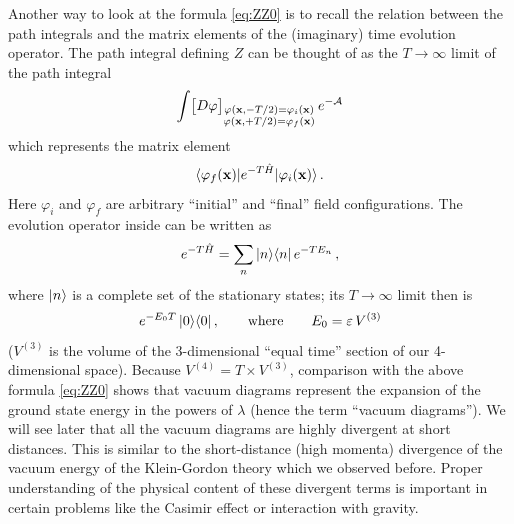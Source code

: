 Another way to look at the formula \eqref{eq:ZZ0} is to recall the relation
between the path integrals and the matrix elements of the (imaginary) time
evolution operator. The path integral defining $Z$ can be thought of as the
$T\to\infty$ limit of the path integral
\[
\int\bigl[D\varphi\bigr]_{\substack{\varphi(\mathbf{x},-T/2)=\varphi_i(\mathbf{x})\\\varphi(\mathbf{x},+T/2)=\varphi_f(\mathbf{x})}}\,e^{-\mathcal A}
\]
which represents the matrix element
\[
\langle \varphi_f(\mathbf{x})|e^{-T\hat H}|\varphi_i(\mathbf{x})\rangle\,.
\]
Here $\varphi_i$ and $\varphi_f$ are arbitrary ``initial'' and ``final''
field configurations. The evolution operator inside can be written as
\[
e^{-T\hat H}=\sum_n|n\rangle\langle n|\,e^{-TE_n}\,,
\]
where $|n\rangle$ is a complete set of the stationary states; its $T\to\infty$
limit then is
\[
e^{-E_0T}\,|0\rangle\langle 0|\,,\qquad\text{where}\qquad E_0=\varepsilon\,V^{(3)}
\]
($V^{(3)}$ is the volume of the 3-dimensional ``equal time'' section of our
4-dimensional space). Because $V^{(4)}=T\times V^{(3)}$, comparison with the
above formula \eqref{eq:ZZ0} shows that vacuum diagrams represent the
expansion of the ground state energy in the powers of $\lambda$ (hence the term
``vacuum diagrams''). We will see later that all the vacuum diagrams are highly
divergent at short distances. This is similar to the short-distance (high
momenta) divergence of the vacuum energy of the Klein-Gordon theory which we
observed before. Proper understanding of the physical content of these
divergent terms is important in certain problems like the Casimir effect or
interaction with gravity.
